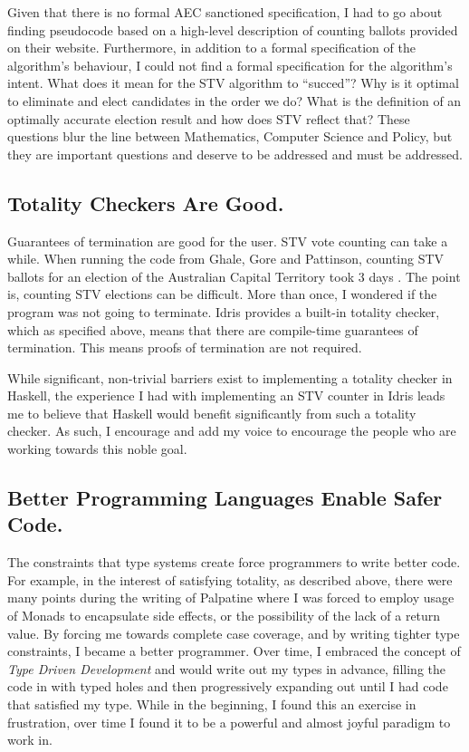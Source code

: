 Given that there is no formal AEC sanctioned specification, I had to go about
finding pseudocode based on a high-level description of counting ballots
provided on their website. Furthermore, in addition to a formal specification of
the algorithm's behaviour, I could not find a formal specification for the
algorithm's intent. What does it mean for the STV algorithm to ``succed''? Why
is it optimal to eliminate and elect candidates in the order we do? What is the
definition of an optimally accurate election result and how does STV reflect
that? These questions blur the line between Mathematics, Computer Science and
Policy, but they are important questions and deserve to be addressed and must be
addressed. 

\subsection{Totality Checkers Are Good.}

Guarantees of termination are good for the user. STV vote counting can take a
while. When running the code from Ghale, Gore and Pattinson, counting STV
ballots for an election of the Australian Capital Territory took 3 days
\cite{stv_haskell}. The point is, counting STV elections can be difficult. More
than once, I wondered if the program was not going to terminate. Idris provides
a built-in totality checker, which as specified above, means that there are
compile-time guarantees of termination. This means proofs of termination are not
required. 

While significant, non-trivial barriers exist to implementing a totality checker
in Haskell, the experience I had with implementing an STV counter in Idris leads
me to believe that Haskell would benefit significantly from such a totality
checker. As such, I encourage and add my voice to encourage the people who are
working towards this noble goal. 

\subsection{Better Programming Languages Enable Safer Code.}

The constraints that type systems create force programmers to write better code.
For example, in the interest of satisfying totality, as described above, there
were many points during the writing of Palpatine where I was forced to
employ usage of Monads to encapsulate side effects, or the possibility of the
lack of a return value. By forcing me towards complete case coverage, and by
writing tighter type constraints, I became a better programmer. Over time, I
embraced the concept of \textit{Type Driven Development} and would write out my
types in advance, filling the code in with typed holes and then progressively
expanding out until I had code that satisfied my type. While in the beginning, I
found this an exercise in frustration, over time I found it to be a powerful and
almost joyful paradigm to work in. 

